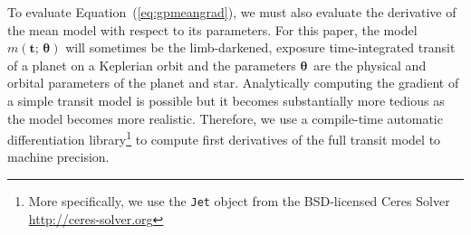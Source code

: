 \documentclass[manuscript, letterpaper]{aastex6}
\renewcommand{\eqref}[1]{\ref{eq:#1}}
\newcommand{\Eq}[1]{Equation~(\eqref{#1})}
\newcommand{\eq}[1]{\Eq{#1}}
\newcommand{\bvec}[1]{{\ensuremath{\boldsymbol{#1}}}}
\newcommand{\paper}{paper}
\newcommand{\meanpars}{{\ensuremath{\bvec{\theta}}}}
\begin{document}
To evaluate \eq{gpmeangrad}, we must also evaluate the derivative of the mean
model with respect to its parameters.
For this \paper, the model $m(\bvec{t};\,\meanpars)$ will sometimes be the
limb-darkened, exposure time-integrated transit of a planet on a Keplerian
orbit and the parameters \meanpars\ are the physical and orbital parameters of
the planet and star.
Analytically computing the gradient of a simple transit model is possible
\citep{Pal:2008} but it becomes substantially more tedious as the model
becomes more realistic.
Therefore, we use a compile-time automatic differentiation library\footnote{%
More specifically, we use the \texttt{Jet} object from the BSD-licensed Ceres
Solver \url{http://ceres-solver.org}} \citep{Agarwal:2016} to compute first
derivatives of the full transit model to machine precision.


\clearpage

\end{document}
